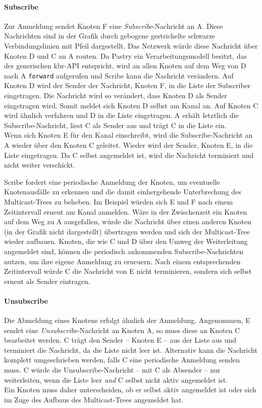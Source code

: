 \paragraph{Subscribe}
Zur Anmeldung sendet Knoten F eine \emph{Subscribe}-Nachricht an A. Diese Nachrichten sind in der Grafik durch gebogene gestrichelte schwarze Verbindungslinien mit Pfeil dargestellt. Das Netzwerk würde diese Nachricht über Knoten D und C an A routen. Da Pastry ein Verarbeitungsmodell besitzt, das der generischen \ac{kbr}-API entspricht, wird an allen Knoten auf dem Weg von D nach A \texttt{forward} aufgerufen und Scribe kann die Nachricht verändern. Auf Knoten D wird der Sender der Nachricht, Knoten F, in die Liste der Subscriber eingetragen. Die Nachricht wird so verändert, dass Knoten D als Sender eingetragen wird. Somit meldet sich Knoten D selbst am Kanal an. Auf Knoten C wird ähnlich verfahren und D in die Liste eingetragen. A erhält letztlich die Subscribe-Nachricht, liest C als Sender aus und trägt C in die Liste ein.\\
Wenn sich Knoten E für den Kanal einschreibt, wird die Subscribe-Nachricht an A wieder über den Knoten C geleitet. Wieder wird der Sender, Knoten E, in die Liste eingetragen. Da C selbst angemeldet ist, wird die Nachricht terminiert und nicht weiter verschickt.

Scribe fordert eine periodische Anmeldung der Knoten, um eventuelle Knotenausfälle zu erkennen und die damit einhergehende Unterbrechung des Multicast-Trees zu beheben. Im Beispiel würden sich E und F nach einem Zeitintervall erneut am Kanal anmelden. Wäre in der Zwischenzeit ein Knoten auf dem Weg zu A ausgefallen, würde die Nachricht über einen anderen Knoten (in der Grafik nicht dargestellt) übertragen werden und sich der Multicast-Tree wieder aufbauen. Knoten, die wie C und D über den Umweg der Weiterleitung angemeldet sind, können die periodisch ankommenden Subscribe-Nachrichten nutzen, um ihre eigene Anmeldung zu erneuern. Nach einem entsprechenden Zeitintervall würde C die Nachricht von E nicht terminieren, sondern sich selbst erneut als Sender eintragen.

\paragraph{Unsubscribe}
Die Abmeldung eines Knotens erfolgt ähnlich der Anmeldung. Angenommen, E sendet eine \emph{Unsubscribe}-Nachricht an Knoten A, so muss diese an Knoten C bearbeitet werden. C trägt den Sender -- Knoten E -- aus der Liste aus und terminiert die Nachricht, da die Liste nicht leer ist. Alternativ kann die Nachricht komplett umgeschrieben werden, falls C eine periodische Anmeldung senden muss. C würde die Unsubscribe-Nachricht -- mit C als Absender -- nur weiterleiten, wenn die Liste leer \emph{und} C selbst nicht aktiv angemeldet ist.\\
Ein Knoten muss daher unterscheiden, ob er selbst aktiv angemeldet ist oder sich im Zuge des Aufbaus des Multicast-Trees angemeldet hat.

